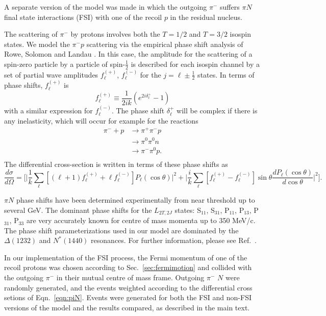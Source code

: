 A separate version of the model was made in which the outgoing $\pi^-$ suffers
$\pi N$ final state interactions (FSI) with one of the recoil $p$ in the
residual nucleus.

The scattering of $\pi^-$ by protons involves both the $T=1/2$ and $T=3/2$
isospin states.  We model the $\pi^- p$ scattering via the empirical phase
shift analysis of Rowe, Solomon and Landau \cite{rowe}.  In this case,
the amplitude for the scattering of a spin-zero particle by a particle of
spin-$\frac{1}{2}$ is described for each isospin channel by a set of partial
wave amplitudes $f^{(+)}_{\ell}$, $f^{(-)}_{\ell}$ for the
$j=\ell\pm\frac{1}{2}$ states.  In terms of phase shifts, $f^{(+)}_{\ell}$ is
\begin{equation}
f^{(+)}_{\ell}\equiv\frac{1}{2ik}(e^{2i\delta^+_{\ell}} -1)
\end{equation}
with a similar expression for $f^{(-)}_{\ell}$.  The phase shift
$\delta^+_{\ell}$ will be complex if there is any inelasticity, which will
occur for example for the reactions
\begin{equation}
\begin{split}
\pi^- + p &\rightarrow \pi^+ \pi^- p \\
          &\rightarrow \pi^0 \pi^0 n \\
          &\rightarrow \pi^- \pi^0 p. \\
\end{split}
\end{equation}
The differential cross-section is written in terms of these phase shifts as
\begin{equation}
\frac{d\sigma}{d\Omega}=\biggl[
\biggl| \frac{1}{k}\sum_{\ell}[(\ell +1) 
f^{(+)}_{\ell} +\ell f^{(-)}_{\ell}] P_{\ell}(\cos\theta)\biggr|^2 +
\biggl| \frac{i}{k}\sum_{\ell}[f^{(+)}_{\ell} -f^{(-)}_{\ell}]\sin\theta 
 \frac{d P_{\ell}(\cos\theta)}{d\cos\theta}\biggr|^2
\biggr].
\label{eqn:piN}
\end{equation}

$\pi N$ phase shifts have been determined experimentally from near threshold up
to several GeV.  The dominant phase shifts for the $L_{2T,2J}$ states:
S$_{11}$, S$_{31}$, P$_{11}$, P$_{13}$, P$_{31}$, P$_{33}$ are very accurately
known for centre of mass momenta up to 350 MeV/c.  The phase shift
parameterizations used in our model are dominated by the $\Delta(1232)$ and
$N^*(1440)$ resonances.  For further information, please see
Ref.~\cite{ericson}.

In our implementation of the FSI process, the Fermi momentum of one of the
recoil protons was chosen according to Sec.~\ref{sec:fermimotion} and collided
with the outgoing $\pi^-$ in their mutual centre of mass frame.  Outgoing
$\pi^-$ $N$ were randomly generated, and the events
weighted according to the differential cross setions of Eqn.~\ref{eqn:piN}.
Events were generated for both the FSI and non-FSI versions of the
model and the results compared, as described in the main text.
